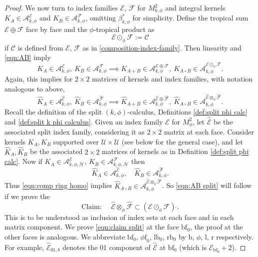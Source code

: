 \documentclass[JEP,XML,SOM,Unicode,NoFloatCountersInSection,published]{cedram}
\theoremstyle{plain}
\theoremstyle{definition}
\newcommand{\Umath}{{\mathscr{U}}}
\newcommand{\Cmath}{{\mathscr{C}}}
\newcommand{\Hmath}{{\mathscr{H}}}
\newcommand\calA{{\mathcal A}}
\newcommand\calE{{\mathcal E}}
\newcommand\calF{{\mathcal F}}
\newcommand{\calEwhat}{{\widehat{\calE}}}
\newcommand{\calFwhat}{{\widehat{\calF}}}
\newcommand{\phif}{{\phi\mathrm{f}}}
\newcommand{\lf}{{\mathrm{lb}}}
\newcommand{\rf}{{\mathrm{rb}}}
\newcommand{\bb}{{\mathrm{b}}}
\renewcommand{\ll}{{\mathrm{l}}}
\newcommand{\rr}{{\mathrm{r}}}
\newcommand{\bbf}{{\mathrm{bf}}}
\newcommand{\bbfz}{{\bbf_0}}
\newcommand{\Kwhat}{{\widehat{K}}}
\begin{document}
\begin{proof}
We now turn to index families $\calE$, $\calF$ for $M^2_{k,\phi}$ and integral kernels
$K_A\in\calA^\calE_{k,\phi}$ and $K_B\in\calA^\calF_{k,\phi}$, omitting $\beta_{k,\phi}^*$ for simplicity. Define the tropical sum
$\calE\oplus\calF$ face by face and the $\phi$-tropical product as
\begin{equation}
\label{eqn:def odot phi}
\calE \odot_\phi \calF := \Cmath
\end{equation}
if $\Cmath$ is defined from $\calE$, $\calF$ as in \eqref{composition-index-family}.
Then linearity and \eqref{eqn:AB} imply
\[
K_A\in \calA^\calE_{k,\phi},\ K_B \in \calA^\calF_{k,\phi} \implies
K_{A+B} \in \calA_{k,\phi}^{\calE\oplus\calF},\ K_{A\circ B}\in\calA_{k,\phi}^{\calE\odot_\phi \calF}.
\]
Again, this implies for $2\times2$ matrices of kernels and index families, with notation analogous to above,
\begin{equation}
\label{eqn:comp ring homo}
\Kwhat_A\in \calA_{k,\phi}^\calEwhat,\ \Kwhat_B \in \calA_{k,\phi}^\calFwhat \implies
\Kwhat_{A+B} \in \calA_{k,\phi}^{\calEwhat\oplus\calFwhat},\ \Kwhat_{A\circ B}\in\calA_{k,\phi}^{\calEwhat\otimes_\phi \calFwhat}.
\end{equation}
Recall the definition of the split $(k,\phi)$-calculus, Definitions \ref{def:split phi calc} and \ref{def:split k phi calculus}.
Given an index family $\calE$ for $M^2_\phi$, let $\calEwhat$ be the associated split index family, considering it as $2\times2$ matrix at each face.
Consider kernels $K_A,K_B$ supported over $\Umath\times\Umath$ (see below for the general case), and let $\Kwhat_A,\Kwhat_B$ be the associated $2\times2$ matrices of kernels as in Definition \ref{def:split phi calc}.
Now if $K_A\in \calA^\calE_{k,\phi,\Hmath}$, $K_{B} \in\calA^\calF_{k,\phi,\Hmath}$
then\vspace*{-3pt}
\[
\Kwhat_A\in\calA^\calEwhat_{k,\phi}, \quad \Kwhat_B\in\calA^\calFwhat_{k,\phi}.
\]
Thus \eqref{eqn:comp ring homo} implies $\Kwhat_{A\circ B}\in \calA^{\calEwhat\otimes_\phi \calFwhat}_{k,\phi}$.
So \eqref{eqn:AB split} will follow if we prove the\vspace*{-3pt}
\begin{equation}
\label{eqn:claim split}
\text{Claim: }\quad \calEwhat \otimes_\phi \calFwhat \subset (\calE \odot_\phi\calF)\,\widehat{}.
\end{equation}
This is to be understood as inclusion of index sets at each face and in each matrix component. We prove \eqref{eqn:claim split} at the face $\bbf_0$, the proof at the other faces is analogous. We abbreviate $\bbf_0$, $\phif_0$, $\lf_0$, $\rf_0$ by $\bb$, $\phi$, $\ll$, $\rr$ respectively. For example, $\calEwhat_{01,b}$ denotes the $01$ component of $\calEwhat$ at $\bbf_0$ (which is $\calE_\bbfz+2$).


\end{proof}
\end{document}
